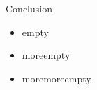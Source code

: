 \begin{frame}{Conclusion}
	\begin{minipage}[c][4cm]{\textwidth}
		\begin{itemize}
			\itemfill
			\item empty
			\item moreempty
			\item moremoreempty
		\end{itemize}
	\end{minipage}
\end{frame}

